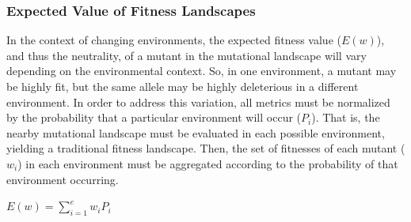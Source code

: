 \documentclass[letterpaper]{article}
\begin{document}

\subsubsection{Expected Value of Fitness Landscapes}
In the context of changing environments, the expected fitness value ($E(w)$), and thus the neutrality, of a mutant in the mutational landscape will vary depending on the environmental context. So, in one environment, a mutant may be highly fit, but the same allele may be highly deleterious in a different environment. In order to address this variation, all metrics must be normalized by the probability that a particular environment will occur ($P_i$). That is, the nearby mutational landscape must be evaluated in each possible environment, yielding a traditional fitness landscape. Then, the set of fitnesses of each mutant ($w_i$) in each environment must be aggregated according to the probability of that environment occurring.
%
%


\begin{center}
$E(w) = \displaystyle\sum_{i=1}^{e} w_i P_i$
\end{center}
\end{document}
